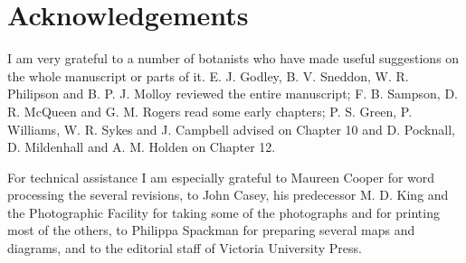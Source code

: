 \chapter*{Acknowledgements}

I am very grateful to a number of botanists who have made useful suggestions on the whole manuscript or parts of it.
E. J. Godley, B. V. Sneddon, W. R. Philipson and B. P. J. Molloy reviewed the entire manuscript; F. B. Sampson, D. R. McQueen and G. M. Rogers read some early chapters; P. S. Green, P. Williams, W. R. Sykes and J. Campbell advised on Chapter 10 and D. Pocknall, D. Mildenhall and A. M. Holden on Chapter 12.

For technical assistance I am especially grateful to Maureen Cooper for word processing the several revisions, to John Casey, his predecessor M. D. King and the Photographic Facility for taking some of the photographs and for printing most of the others, to Philippa Spackman for preparing several maps and diagrams, and to the editorial staff of Victoria University Press.

